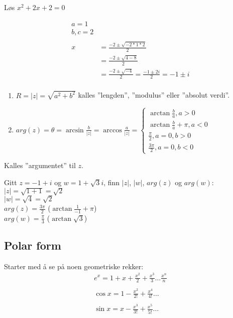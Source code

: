 \documentclass[11pt, a4paper, norsk]{article}
\begin{document}
	\begin{Example}{}{}
	  Løs $x^{2} + 2x + 2 = 0$

	  \begin{align*}
	    a = 1 \\
	    b, c = 2 \\
	    \\
        x &= \frac{-2 \pm \sqrt{- 2*1*2}}{2} \\
	      &= \frac{-2 \pm \sqrt{4 - 8}}{2} \\
	      &= \frac{-2 \pm \sqrt{-4}}{2} = \frac{-1 \pm 2i}{2} = -1 \pm i \\
	  \end{align*} 
     \end{Example} 
     \begin{Formel}{}{}
         \begin{enumerate}
             \item $R = |z| = \sqrt{a^2 + b^2}$ kalles ''lengden'', ''modulus'' eller ''absolut verdi''.
             \item $arg(z) = \theta = \arcsin{\frac{b}{|z|}} = \arccos{\frac{a}{|z|}} = \begin{cases}
            \arctan{\frac{b}{a}}, a>0 \\
            \arctan{\frac{b}{a}} + \pi, a < 0 \\
            \frac{\pi}{2}, a=0, b>0 \\
            \frac{3\pi}{2}, a = 0, b < 0
    \end{cases} $
         \end{enumerate} Kalles ''argumentet'' til $z$.
     \end{Formel}
     \begin{Example}{}{}
         Gitt $z = -1 + i$ og $w = 1 + \sqrt{3}i$, finn $|z|$, $|w|$, $arg(z)$ og $arg(w)$:
         \\
         $|z| = \sqrt{1+1} = \sqrt{2}$ \\
         $|w| = \sqrt{4} = \sqrt{2}$ \\
         $arg(z) = \frac{3\pi}{2}$ ($\arctan{\frac{1}{-1}} + \pi$) \\
         $arg(w) = \frac{\pi}{3}$ ($\arctan{\sqrt{3}}$)
     \end{Example}
     \subsection{Polar form}%
     \label{sub:polar_form}
        Starter med å se på noen geometriske rekker:
        \begin{align*}
            e^{x} = 1 + x + \frac{x^2}{2} + \frac{x^{3}}{3} \dots \frac{x^{n}}{n}
            \\
            \\
            \cos{x} = 1 - \frac{x^2}{2!} + \frac{x^{4}}{4!} \dots
            \\
            \\
            \sin{x} = x - \frac{x^{3}}{3!} + \frac{x^{5}}{5!} \dots
        \end{align*}
\end{document}

